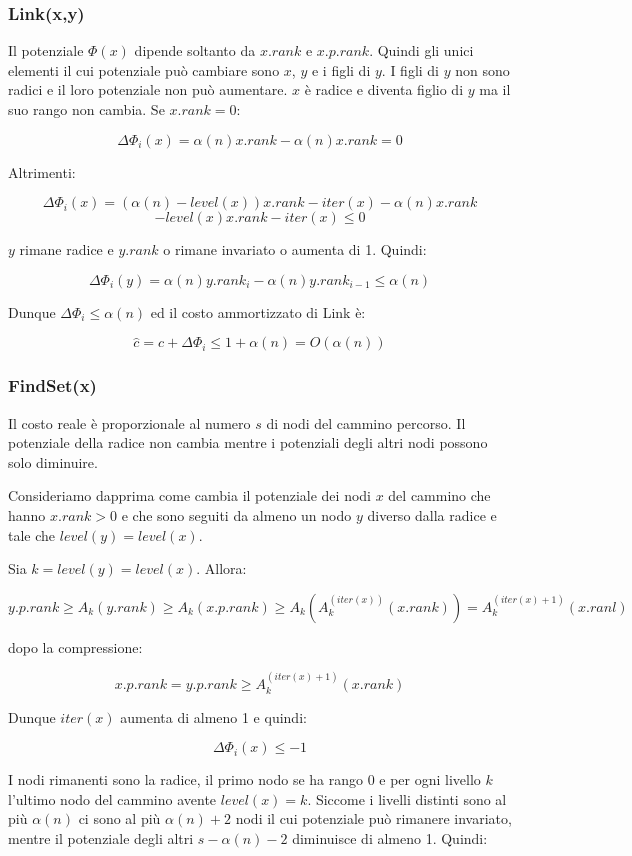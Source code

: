 \subsubsection{Link(x,y)}

Il potenziale $\Phi(x)$ dipende soltanto da $x.rank$ e $x.p.rank$. Quindi gli unici elementi il cui potenziale può cambiare sono $x$, $y$ e i figli di $y$. I figli di $y$ non sono radici e il loro potenziale non può aumentare. $x$ è radice e diventa figlio di $y$ ma il suo rango non cambia. Se $x.rank=0$:

$$\Delta\Phi_i(x)=\alpha(n)x.rank-\alpha(n)x.rank=0$$

Altrimenti:

$$\Delta\Phi_i(x)=(\alpha(n)-level(x))x.rank-iter(x)-\alpha(n)x.rank$$
$$-level(x)x.rank-iter(x)\le 0$$

$y$ rimane radice e $y.rank$ o rimane invariato o aumenta di 1. Quindi:

$$\Delta\Phi_i(y)=\alpha(n)y.rank_i-\alpha(n)y.rank_{i-1}\le \alpha(n)$$

Dunque $\Delta\Phi_i\le\alpha(n)$ ed il costo ammortizzato di Link è:

$$\hat{c}=c+\Delta\Phi_i\le 1 +\alpha(n)=O(\alpha(n))$$

\subsubsection{FindSet(x)} 

Il costo reale è proporzionale al numero $s$ di nodi del cammino percorso. Il potenziale della radice non cambia mentre i potenziali degli altri nodi possono solo diminuire.

Consideriamo dapprima come cambia il potenziale dei nodi $x$ del cammino che hanno $x.rank>0$ e che sono seguiti da almeno un nodo $y$ diverso dalla radice e tale che $level(y)=level(x)$.

Sia $k=level(y)=level(x)$. Allora:

$$y.p.rank\ge A_k(y.rank)\ge A_k(x.p.rank)\ge A_k(A_k^{(iter(x))}(x.rank))=A_k^{(iter(x)+1)}(x.ranl)$$

dopo la compressione:

$$x.p.rank=y.p.rank\ge A_k^{(iter(x)+1)}(x.rank)$$

Dunque $iter(x)$ aumenta di almeno 1 e quindi:

$$\Delta\Phi_i(x)\le-1$$

I nodi rimanenti sono la radice, il primo nodo se ha rango 0 e per ogni livello $k$ l'ultimo nodo del cammino avente $level(x)=k$. Siccome i livelli distinti sono al più $\alpha(n)$ ci sono al più $\alpha(n)+2$ nodi il cui potenziale può rimanere invariato, mentre il potenziale degli altri $s-\alpha(n)-2$ diminuisce di almeno 1. Quindi:

